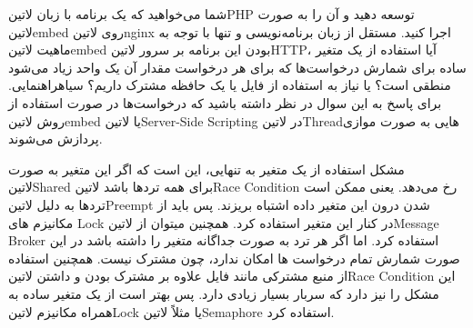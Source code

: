 
شما می‌خواهید که یک برنامه با زبان ‌لاتین{PHP} توسعه دهید و آن را به صورت ‌لاتین{embed} روی ‌لاتین{nginx} اجرا کنید.
مستقل از زبان برنامه‌نویسی و تنها با توجه به ماهیت ‌لاتین{embed} بودن این برنامه بر سرور ‌لاتین{HTTP}، آیا استفاده از یک متغیر ساده برای شمارش درخواست‌ها
که برای هر درخواست مقدار آن یک واحد زیاد می‌شود منطقی است؟ یا نیاز به استفاده از فایل یا یک حافظه مشترک داریم؟
‌سیاه{راهنمایی.} برای پاسخ به این سوال در نظر داشته باشید که درخواست‌ها در صورت استفاده از روش ‌لاتین{embed} یا ‌لاتین{Server-Side Scripting}
در ‌لاتین{Thread}هایی به صورت موازی پردازش می‌شوند.


\begin{پاسخ}

مشکل استفاده از یک متغیر به تنهایی، این است که اگر این متغیر به صورت ‌لاتین{Shared} برای همه تردها باشد ‌لاتین{Race Condition} رخ می‌دهد.
یعنی ممکن است تردها به دلیل ‌لاتین{Preempt} شدن درون این متغیر داده اشتباه بریزند.
پس باید از مکانیزم های Lock در کنار این متغیر استفاده کرد. همچنین میتوان از ‌لاتین{Message Broker} استفاده کرد.
اما اگر هر ترد به صورت جداگانه متغیر را داشته باشد در این صورت شمارش تمام درخواست ها امکان ندارد، چون مشترک نیست.
همچنین استفاده از منبع مشترکی مانند فایل علاوه بر مشترک بودن و داشتن ‌لاتین{Race Condition} این مشکل را نیز دارد که سربار بسیار زیادی دارد.
پس بهتر است از یک متغیر ساده به همراه مکانیزم ‌لاتین{Lock} یا مثلاً ‌لاتین{Semaphore} استفاده کرد.

\end{پاسخ}
